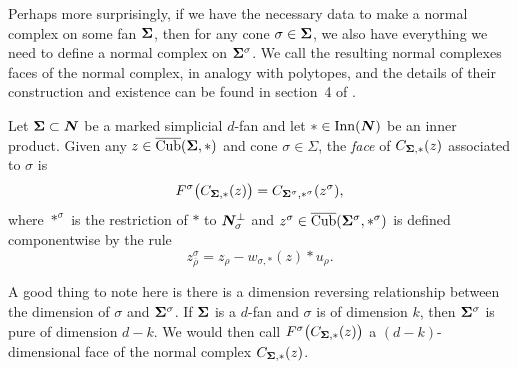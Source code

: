 \documentclass[12pt,oneside]{../../sfsuthesis}
\begin{document}
Perhaps more surprisingly, if we have the necessary data to make a normal complex on some fan \( {\bm{\Sigma}} \), then for any cone \( \sigma \in {\bm{\Sigma}} \), we also have everything we need to define a normal complex on \( {\bm{\Sigma}}^\sigma \).
We call the resulting normal complexes faces of the normal complex, in analogy with polytopes, and the details of their construction and existence can be found in section~4 of \cite{nowakMixedVolumesNormal2023}.
\begin{definition}\th\label{def:faceNC}
    Let \( {\bm{\Sigma}} \subset \bm{N} \) be a marked simplicial \( d \)-fan and let \( \ast \in \operatorname{Inn}(\bm{N}) \) be an inner product.
    Given any \( z \in \operatorname{\overline{Cub}}({\bm{\Sigma}}, \ast) \) and cone \( \sigma \in \Sigma \), the \emph{face} of \( C_{{\bm{\Sigma}}, \ast}(z) \) associated to \( \sigma \) is
    \[
        F^\sigma\big(C_{{\bm{\Sigma}}, \ast}(z)\big)  = C_{{\bm{\Sigma}}^\sigma, \ast^\sigma}(z^\sigma),
    \]
    where \( \ast^\sigma \) is the restriction of \( \ast \) to \( \bm{N}_\sigma^\bot \) and \( z^\sigma \in \operatorname{\overline{Cub}}({\bm{\Sigma}}^\sigma, \ast^\sigma) \) is defined componentwise by the rule
    \[
        z^\sigma_{\overline{\rho}} = z_\rho - w_{\sigma, \ast}(z) \ast u_\rho.
    \]
\end{definition}
A good thing to note here is there is a dimension reversing relationship between the dimension of \( \sigma \) and \( {\bm{\Sigma}}^\sigma\).
If \( {\bm{\Sigma}} \) is a \( d \)-fan and \( \sigma \) is of dimension \( k \), then \( {\bm{\Sigma}}^\sigma \) is pure of dimension \( d-k \).
We would then call \( F^\sigma\big(C_{{\bm{\Sigma}}, \ast}(z)\big) \) a \( (d-k) \)-dimensional face of the normal complex \( C_{{\bm{\Sigma}}, \ast}(z) \).
\end{document}
